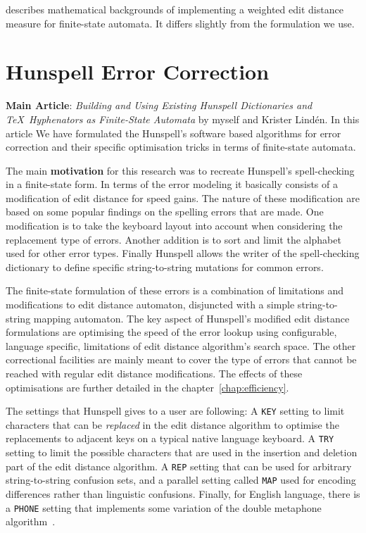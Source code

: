 \documentclass[officiallayout]{unihelcompling}
\begin{document}
\citet{mohri2003edit} describes mathematical backgrounds of
implementing a weighted edit distance measure for finite-state automata. It
differs slightly from the formulation we use.

\section{Hunspell Error Correction}
\label{sec:Hunspell-error}

\textbf{Main Article}: \emph{Building and Using Existing Hunspell Dictionaries
and \TeX\ Hyphenators as Finite-State Automata} by myself and Krister Lindén.
In this article We have formulated the Hunspell's software based algorithms for
error correction and their specific optimisation tricks in terms of
finite-state automata.

The main \textbf{motivation} for this research was to recreate Hunspell's
spell-checking in a finite-state form. In terms of the  error modeling it
basically consists of a modification of edit distance for speed gains. The
nature of these modification are based on some popular findings on the spelling
errors that are made. One modification is to take the keyboard layout into
account when considering the replacement type of errors. Another addition is to
sort and limit the alphabet used for other error types. Finally Hunspell allows
the writer of the spell-checking dictionary to define specific string-to-string
mutations for common errors.

The finite-state formulation of these errors is a combination of limitations
and modifications to edit distance automaton, disjuncted with a simple
string-to-string mapping automaton. The key aspect of Hunspell's modified
edit distance formulations are optimising the speed of the error lookup using
configurable, language specific, limitations of edit distance algorithm's
search space. The other correctional facilities are mainly meant to cover the
type of errors that cannot be reached with regular edit distance modifications.
The effects of these optimisations are further detailed in the 
chapter~\ref{chap:efficiency}.

The settings that Hunspell gives to a user are following: A \texttt{KEY}
setting to limit characters that can be \emph{replaced} in the edit distance
algorithm to optimise the replacements to adjacent keys on a typical native
language keyboard. A \texttt{TRY} setting to limit the possible characters
that are used in the insertion and deletion part of the edit distance
algorithm. A \texttt{REP} setting that can be used for arbitrary
string-to-string confusion sets, and a parallel setting called \texttt{MAP}
used for encoding differences rather than linguistic confusions.  Finally, for
English language, there is a \texttt{PHONE} setting that implements some
variation of the double metaphone algorithm~\citep{philips2000double}.
\end{document}
